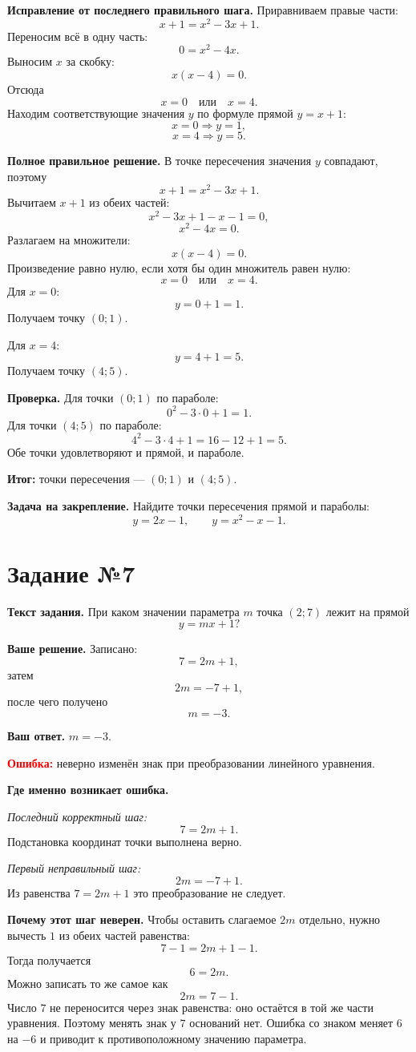 \documentclass[12pt,a4paper]{article}
\begin{document}
\textbf{Исправление от последнего правильного шага.}
Приравниваем правые части:
\[
x+1=x^2-3x+1.
\]
Переносим всё в одну часть:
\[
0=x^2-4x.
\]
Выносим $x$ за скобку:
\[
x(x-4)=0.
\]
Отсюда
\[
x=0 \quad \text{или} \quad x=4.
\]
Находим соответствующие значения $y$ по формуле прямой $y=x+1$:
\[
x=0 \Rightarrow y=1,
\]
\[
x=4 \Rightarrow y=5.
\]

\textbf{Полное правильное решение.}
В точке пересечения значения $y$ совпадают, поэтому
\[
x+1=x^2-3x+1.
\]
Вычитаем $x+1$ из обеих частей:
\[
x^2-3x+1-x-1=0,
\]
\[
x^2-4x=0.
\]
Разлагаем на множители:
\[
x(x-4)=0.
\]
Произведение равно нулю, если хотя бы один множитель равен нулю:
\[
x=0 \quad \text{или} \quad x=4.
\]
Для $x=0$:
\[
y=0+1=1.
\]
Получаем точку $(0;1)$.

Для $x=4$:
\[
y=4+1=5.
\]
Получаем точку $(4;5)$.

\textbf{Проверка.}
Для точки $(0;1)$ по параболе:
\[
0^2-3\cdot 0+1=1.
\]
Для точки $(4;5)$ по параболе:
\[
4^2-3\cdot 4+1=16-12+1=5.
\]
Обе точки удовлетворяют и прямой, и параболе.

\textcolor{teal!60!black}{\textbf{Итог:}} точки пересечения --- $(0;1)$ и $(4;5)$.

\textbf{Задача на закрепление.}
Найдите точки пересечения прямой и параболы:
\[
y=2x-1, \qquad y=x^2-x-1.
\]

\newpage
{}\label{task:7}
\section*{Задание №7}

\textbf{Текст задания.}
При каком значении параметра $m$ точка $(2;7)$ лежит на прямой
\[
y=mx+1?
\]

\textbf{Ваше решение.}
Записано:
\[
7=2m+1,
\]
затем
\[
2m=-7+1,
\]
после чего получено
\[
m=-3.
\]

\textbf{Ваш ответ.}
$m=-3$.

\textcolor{red}{\textbf{Ошибка:}} неверно изменён знак при преобразовании линейного уравнения.

\textbf{Где именно возникает ошибка.}

\emph{Последний корректный шаг:}
\[
7=2m+1.
\]
Подстановка координат точки выполнена верно.

\emph{Первый неправильный шаг:}
\[
2m=-7+1.
\]
Из равенства $7=2m+1$ это преобразование не следует.

\textbf{Почему этот шаг неверен.}
Чтобы оставить слагаемое $2m$ отдельно, нужно вычесть $1$ из обеих частей равенства:
\[
7-1=2m+1-1.
\]
Тогда получается
\[
6=2m.
\]
Можно записать то же самое как
\[
2m=7-1.
\]
Число $7$ не переносится через знак равенства: оно остаётся в той же части уравнения. Поэтому менять знак у $7$ оснований нет. Ошибка со знаком меняет $6$ на $-6$ и приводит к противоположному значению параметра.
\end{document}
